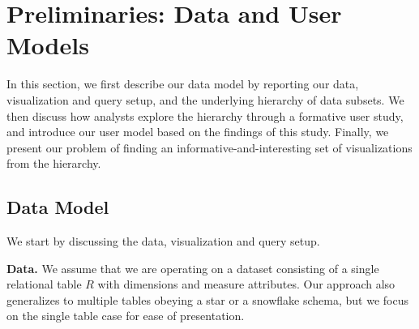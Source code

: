 \section{Preliminaries: Data and User Models} 

In this section, we first describe our data model by reporting our data, visualization and query setup, and the underlying hierarchy of data subsets. We then discuss how analysts explore the hierarchy through a formative user study, and introduce our user model based on the findings of this study. Finally, we present our problem of finding an informative-and-interesting set of visualizations from the hierarchy.


\subsection{Data Model}
We start by discussing the data, visualization and query setup.

\textbf{Data.} We assume that we are operating on a dataset consisting of a single relational table $R$ with dimensions and measure attributes. Our approach also generalizes to multiple tables obeying a star or a snowflake schema, but we focus on the single table case for ease of presentation.


